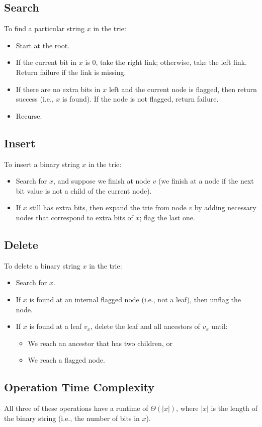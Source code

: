 \documentclass{report}
\begin{document}
\subsection{Search}
To find a particular string $x$ in the trie:
\begin{itemize}
\item Start at the root.
\item If the current bit in $x$ is 0, take the right link; otherwise, take the left link. Return failure if the link is missing.
\item If there are no extra bits in $x$ left and the current node is flagged, then return success (i.e., $x$ is found). If the node is not flagged, return failure.
\item Recurse.
\end{itemize}
\subsection{Insert}
To insert a binary string $x$ in the trie:
\begin{itemize}
\item Search for $x$, and suppose we finish at node $v$ (we finish at a node if the next bit value is not a child of the current node).
\item If $x$ still has extra bits, then expand the trie from node $v$ by adding necessary nodes that correspond to extra bits of $x$; flag the last one.
\end{itemize}
\subsection{Delete}
To delete a binary string $x$ in the trie:
\begin{itemize}
\item Search for $x$.
\item If $x$ is found at an internal flagged node (i.e., not a leaf), then unflag the node.
\item If $x$ is found at a leaf $v_x$, delete the leaf and all ancestors of $v_x$ until:
\begin{itemize}
\item We reach an ancestor that has two children, or
\item We reach a flagged node.
\end{itemize}
\end{itemize}
\subsection{Operation Time Complexity}
All three of these operations have a runtime of $\Theta(|x|)$, where $|x|$ is the length of the binary string (i.e., the number of bits in $x$).
\end{document}
